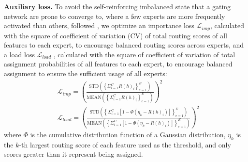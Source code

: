 \documentclass{article}
\begin{document}
	\textbf{Auxiliary loss.} To avoid the self-reinforcing imbalanced state that a gating network are prone to converge to, where a few experts are more frequently activated than others, followed \cite{RN7}, we optimize an importance loss $\mathcal{L}_{imp}$, calculated with the square of coefficient of variation (CV) of total routing scores of all features to each expert, to encourage balanced routing scores across experts, and a load loss $\mathcal{L}_{load}$ , calculated with the square of coefficient of variation of total assignment probabilities of all features to each expert, to encourage balanced assignment to ensure the sufficient usage of all experts:
	\begin{align}
		&\mathcal{L}_{imp}=\left(\tfrac{\mathrm{STD}\left(\left\{\Sigma_{i=1}^{C}R\left(h\right)_{i}\right\}_{e=1}^{E}\right)}{\mathrm{MEAN}\left(\left\{\Sigma_{i=1}^{C}R\left(h\right)_{i}\right\}_{e=1}^{E}\right)}\right)^{2} \label{loss_imp}\\
		&\mathcal{L}_{load}=\left(\tfrac{\mathrm{STD}\left(\left\{\Sigma_{i=1}^{C}\left[1-\Phi\left(\eta_{k}-R\left(h\right)_{i}\right)\right]\right\}_{e=1}^{E}\right)}{\mathrm{MEAN}\left(\left\{\Sigma_{i=1}^{C}\left[1-\Phi\left(\eta_{k}-R\left(h\right)_{i}\right)\right]\right\}_{e=1}^{E}\right)}\right)^{2} \label{loss_load}
	\end{align}
	where $\Phi$ is the cumulative distribution function of a Gaussian distribution, $\eta_{k}$ is the $k$-th largest routing score of each feature used as the threshold, and only scores greater than it represent being assigned.
	
\end{document}
